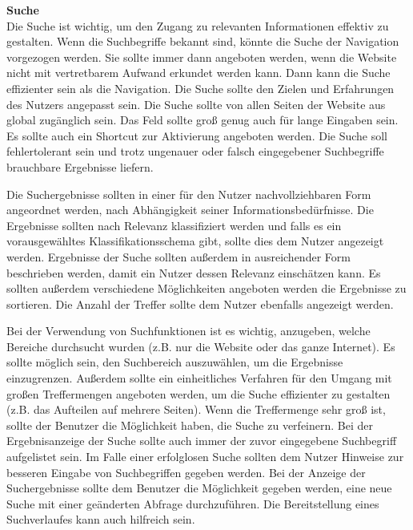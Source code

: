 \documentclass[utf8,biblatex]{lni}
\begin{document}
\textbf{Suche}\\
Die Suche ist wichtig, um den Zugang zu relevanten Informationen effektiv zu gestalten. Wenn die Suchbegriffe bekannt sind, könnte die Suche der Navigation vorgezogen werden. Sie sollte immer dann angeboten werden, wenn die Website nicht mit vertretbarem Aufwand erkundet werden kann. Dann kann die Suche effizienter sein als die Navigation. Die Suche sollte den Zielen und Erfahrungen des Nutzers angepasst sein. Die Suche sollte von allen Seiten der Website aus global zugänglich sein. Das Feld sollte groß genug auch für lange Eingaben sein. Es sollte auch ein Shortcut zur Aktivierung angeboten werden. Die Suche soll fehlertolerant sein und trotz ungenauer oder falsch eingegebener Suchbegriffe brauchbare Ergebnisse liefern.

Die Suchergebnisse sollten in einer für den Nutzer nachvollziehbaren Form angeordnet werden, nach Abhängigkeit seiner Informationsbedürfnisse. Die Ergebnisse sollten nach Relevanz klassifiziert werden und falls es ein vorausgewähltes Klassifikationsschema gibt, sollte dies dem Nutzer angezeigt werden. Ergebnisse der Suche sollten außerdem in ausreichender Form beschrieben werden, damit ein Nutzer dessen Relevanz einschätzen kann. Es sollten außerdem verschiedene Möglichkeiten angeboten werden die Ergebnisse zu sortieren. Die Anzahl der Treffer sollte dem Nutzer ebenfalls angezeigt werden.

Bei der Verwendung von Suchfunktionen ist es wichtig, anzugeben, welche Bereiche durchsucht wurden (z.B. nur die Website oder das ganze Internet). Es sollte möglich sein, den Suchbereich auszuwählen, um die Ergebnisse einzugrenzen. Außerdem sollte ein einheitliches Verfahren für den Umgang mit großen Treffermengen angeboten werden, um die Suche effizienter zu gestalten (z.B. das Aufteilen auf mehrere Seiten). Wenn die Treffermenge sehr groß ist, sollte der Benutzer die Möglichkeit haben, die Suche zu verfeinern. Bei der Ergebnisanzeige der Suche sollte auch immer der zuvor eingegebene Suchbegriff aufgelistet sein.
Im Falle einer erfolglosen Suche sollten dem Nutzer Hinweise zur besseren Eingabe von Suchbegriffen gegeben werden. Bei der Anzeige der Suchergebnisse sollte dem Benutzer die Möglichkeit gegeben werden, eine neue Suche mit einer geänderten Abfrage durchzuführen. Die Bereitstellung eines Suchverlaufes kann auch hilfreich sein. 
\end{document}
